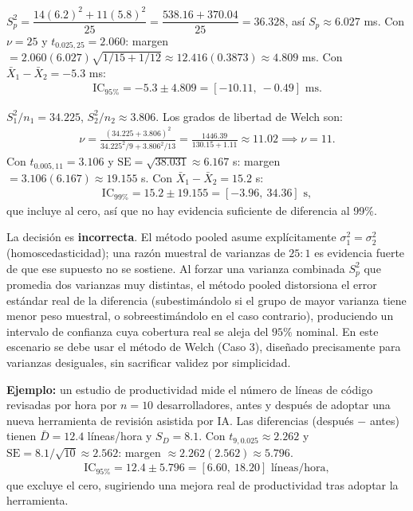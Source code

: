 \begin{solproblema}[prob:f1e6f4b]
	$S_p^2 = \dfrac{14(6.2)^2+11(5.8)^2}{25} = \dfrac{538.16+370.04}{25} = 36.328$, así $S_p\approx6.027$ ms. Con $\nu=25$ y $t_{0.025,25}=2.060$: margen $=2.060(6.027)\sqrt{1/15+1/12}\approx12.416(0.3873)\approx4.809$ ms. Con $\bar X_1-\bar X_2=-5.3$ ms:
	\begin{align*}
		\text{IC}_{95\%} = -5.3\pm4.809 = [-10.11,\ -0.49]\text{ ms.}
	\end{align*}
\end{solproblema}

\begin{solproblema}[prob:51e0d64]
	$S_1^2/n_1 = 34.225$, $S_2^2/n_2\approx3.806$. Los grados de libertad de Welch son:
	\begin{align*}
		\nu = \frac{(34.225+3.806)^2}{34.225^2/9+3.806^2/13} = \frac{1446.39}{130.15+1.11} \approx11.02 \implies \nu=11.
	\end{align*}
	Con $t_{0.005,11}=3.106$ y $\text{SE}=\sqrt{38.031}\approx6.167$ s: margen $=3.106(6.167)\approx19.155$ s. Con $\bar X_1-\bar X_2=15.2$ s:
	\begin{align*}
		\text{IC}_{99\%} = 15.2\pm19.155 = [-3.96,\ 34.36]\text{ s},
	\end{align*}
	que incluye al cero, así que no hay evidencia suficiente de diferencia al 99\%.
\end{solproblema}

\begin{solproblema}[prob:4b6b800]
	La decisión es \textbf{incorrecta}. El método pooled asume explícitamente $\sigma_1^2=\sigma_2^2$ (homoscedasticidad); una razón muestral de varianzas de $25{:}1$ es evidencia fuerte de que ese supuesto no se sostiene. Al forzar una varianza combinada $S_p^2$ que promedia dos varianzas muy distintas, el método pooled distorsiona el error estándar real de la diferencia (subestimándolo si el grupo de mayor varianza tiene menor peso muestral, o sobreestimándolo en el caso contrario), produciendo un intervalo de confianza cuya cobertura real se aleja del $95\%$ nominal. En este escenario se debe usar el método de Welch (Caso 3), diseñado precisamente para varianzas desiguales, sin sacrificar validez por simplicidad.
\end{solproblema}

\begin{solproblema}[prob:ae13605]
	\textbf{Ejemplo:} un estudio de productividad mide el número de líneas de código revisadas por hora por $n=10$ desarrolladores, antes y después de adoptar una nueva herramienta de revisión asistida por IA. Las diferencias (después $-$ antes) tienen $\bar D = 12.4$ líneas/hora y $S_D=8.1$. Con $t_{9,0.025}\approx2.262$ y $\text{SE}=8.1/\sqrt{10}\approx2.562$: margen $\approx2.262(2.562)\approx5.796$.
	\begin{align*}
		\text{IC}_{95\%} = 12.4\pm5.796 = [6.60,\ 18.20]\text{ líneas/hora},
	\end{align*}
	que excluye el cero, sugiriendo una mejora real de productividad tras adoptar la herramienta.
\end{solproblema}

